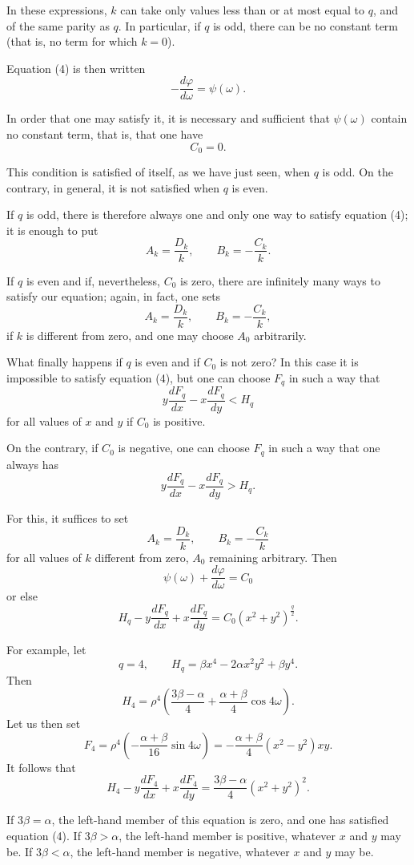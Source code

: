 \documentclass[11pt]{article}
\begin{document}
In these expressions, $k$ can take only values less than or at most equal to $q$, and of the same parity as $q$. In particular, if $q$ is odd, there can be no constant term (that is, no term for which $k=0$).

Equation (4) is then written
\[
-\frac{d\varphi}{d\omega}=\psi(\omega).
\]

In order that one may satisfy it, it is necessary and sufficient that $\psi(\omega)$ contain no constant term, that is, that one have
\[
C_0=0.
\]

This condition is satisfied of itself, as we have just seen, when $q$ is odd. On the contrary, in general, it is not satisfied when $q$ is even.

If $q$ is odd, there is therefore always one and only one way to satisfy equation (4); it is enough to put
\[
A_k=\frac{D_k}{k},
\qquad
B_k=-\frac{C_k}{k}.
\]

If $q$ is even and if, nevertheless, $C_0$ is zero, there are infinitely many ways to satisfy our equation; again, in fact, one sets
\[
A_k=\frac{D_k}{k},
\qquad
B_k=-\frac{C_k}{k},
\]
if $k$ is different from zero, and one may choose $A_0$ arbitrarily.

What finally happens if $q$ is even and if $C_0$ is not zero? In this case it is impossible to satisfy equation (4), but one can choose $F_q$ in such a way that
\[
y\frac{dF_q}{dx}-x\frac{dF_q}{dy}<H_q
\]
for all values of $x$ and $y$ if $C_0$ is positive.

On the contrary, if $C_0$ is negative, one can choose $F_q$ in such a way that one always has
\[
y\frac{dF_q}{dx}-x\frac{dF_q}{dy}>H_q.
\]

For this, it suffices to set
\[
A_k=\frac{D_k}{k},
\qquad
B_k=-\frac{C_k}{k}
\]
for all values of $k$ different from zero, $A_0$ remaining arbitrary. Then
\[
\psi(\omega)+\frac{d\varphi}{d\omega}=C_0
\]
or else
\[
H_q-y\frac{dF_q}{dx}+x\frac{dF_q}{dy}=C_0(x^2+y^2)^{\frac q2}.
\]

For example, let
\[
q=4,
\qquad
H_q=\beta x^4-2\alpha x^2y^2+\beta y^4.
\]
Then
\[
H_4=\rho^4\left(\frac{3\beta-\alpha}{4}+\frac{\alpha+\beta}{4}\cos4\omega\right).
\]
Let us then set
\[
F_4=\rho^4\left(-\frac{\alpha+\beta}{16}\sin4\omega\right)
=-\frac{\alpha+\beta}{4}(x^2-y^2)xy.
\]
It follows that
\[
H_4-y\frac{dF_4}{dx}+x\frac{dF_4}{dy}=\frac{3\beta-\alpha}{4}(x^2+y^2)^2.
\]

If $3\beta=\alpha$, the left-hand member of this equation is zero, and one has satisfied equation (4). If $3\beta>\alpha$, the left-hand member is positive, whatever $x$ and $y$ may be. If $3\beta<\alpha$, the left-hand member is negative, whatever $x$ and $y$ may be.
\end{document}
